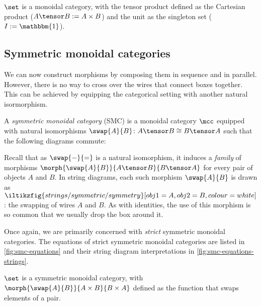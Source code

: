 


\begin{example}
    \(\set\) is a monoidal category, with the tensor product defined as the
    Cartesian product (\(A \tensor B := A \times B\)) and the unit as the
    singleton set (\(I := \mathbbm{1}\)).
\end{example}

\subsection{Symmetric monoidal categories}

We can now construct morphisms by composing them in sequence and in parallel.
However, there is no way to cross over the wires that connect boxes together.
This can be achieved by equipping the categorical setting with another natural
isormorphism.

\begin{definition}
    \label{def:symmetric-monoidal-category}
    A \emph{symmetric monoidal category} (SMC) is a monoidal category \(\mcc\)
    equipped with natural isomorphisms \(
        \swap{A}{B} \colon A \tensor B \cong B \tensor A
    \) such that the following diagrams commute:
    \begin{center}
        
        

        \vspace{1em}

        
    \end{center}
\end{definition}

Recall that as \(\swap{-}{=}\) is a natural isomorphism, it induces
a \emph{family} of morphisms \(
    \morph{\swap{A}{B}}{A \tensor B}{B \tensor A}
\) for every pair of objects \(A\) and \(B\).
In string diagrams, each such morphism \(\swap{A}{B}\) is drawn as \(
    \iltikzfig{strings/symmetric/symmetry}[obj1=A, obj2=B, colour=white]
\): the swapping of wires \(A\) and \(B\).
As with identities, the use of this morphism is so common that we usually
drop the box around it.

Once again, we are primarily concerned with \emph{strict} symmetric
monoidal categories.
The equations of strict symmetric monoidal categories are listed in
\cref{fig:smc-equations} and their string diagram interpretations in
\cref{fig:smc-equations-strings}.






\begin{example}
    \(\set\) is a symmetric monoidal category, with \(
        \morph{\swap{A}{B}}{A \times B}{B \times A}
    \) defined as the function that swaps elements of a pair.
\end{example}